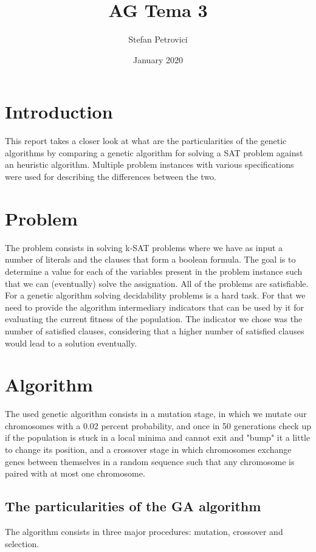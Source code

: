 \documentclass{article}
\title{AG Tema 3}
\author{Stefan Petrovici}
\date{January 2020}
\begin{document}
\maketitle

\section{Introduction}
This report takes a closer look at what are the particularities of the genetic algorithms by comparing a genetic algorithm for solving a SAT problem against an heuristic algorithm. Multiple problem instances with various specifications were used for describing the differences between the two.

\section{Problem}
The problem consists in solving k-SAT problems where we have as input a number of literals and the clauses that form a boolean formula. The goal is to determine a value for each of the variables present in the problem instance such that we can (eventually) solve the assignation. All of the problems are satisfiable. For a genetic algorithm solving decidability problems is a hard task. For that we need to provide the algorithm intermediary indicators that can be used by it for evaluating the current fitness of the population. The indicator we chose was the number of satisfied clauses, considering that a higher number of satisfied clauses would lead to a solution eventually.

\section{Algorithm}
The used genetic algorithm consists in a mutation stage, in which we mutate our chromosomes with a 0.02 percent probability, and once in 50 generations check up if the population is stuck in a local minima and cannot exit and "bump" it a little to change its position, and a crossover stage in which chromosomes exchange genes between themselves in a random sequence such that any chromosome is paired with at most one chromosome.

\subsection{The particularities of the GA algorithm}
The algorithm consists in three major procedures: mutation, crossover and selection.
\end{document}
